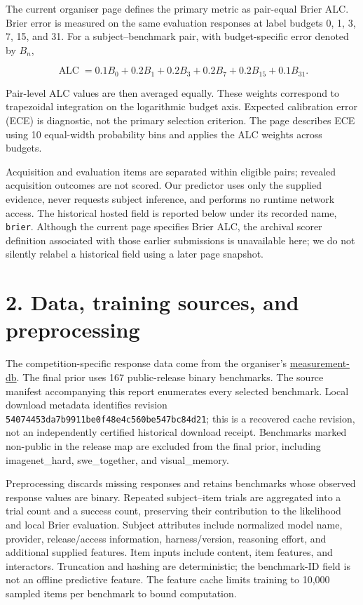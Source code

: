 \documentclass{article}
\providecommand{\passthrough}[1]{#1}
\begin{document}
The current organiser page defines the primary metric as pair-equal Brier ALC. Brier error is measured on the same evaluation responses at label budgets 0, 1, 3, 7, 15, and 31. For a subject--benchmark pair, with budget-specific error denoted by \(B_n\),

\[\operatorname{ALC}=0.1B_0+0.2B_1+0.2B_3+0.2B_7+0.2B_{15}+0.1B_{31}.\]

Pair-level ALC values are then averaged equally. These weights correspond to trapezoidal integration on the logarithmic budget axis. Expected calibration error (ECE) is diagnostic, not the primary selection criterion. The page describes ECE using 10 equal-width probability bins and applies the ALC weights across budgets.

Acquisition and evaluation items are separated within eligible pairs; revealed acquisition outcomes are not scored. Our predictor uses only the supplied evidence, never requests subject inference, and performs no runtime network access. The historical hosted field is reported below under its recorded name, \passthrough{\lstinline!brier!}. Although the current page specifies Brier ALC, the archival scorer definition associated with those earlier submissions is unavailable here; we do not silently relabel a historical field using a later page snapshot.

\section{2. Data, training sources, and preprocessing}\label{data-training-sources-and-preprocessing}

The competition-specific response data come from the organiser's \href{https://huggingface.co/datasets/aims-foundations/measurement-db}{measurement-db}. The final prior uses 167 public-release binary benchmarks. The source manifest accompanying this report enumerates every selected benchmark. Local download metadata identifies revision \passthrough{\lstinline!54074453da7b9911be0f48e4c560be547bc84d21!}; this is a recovered cache revision, not an independently certified historical download receipt. Benchmarks marked non-public in the release map are excluded from the final prior, including imagenet\_hard, swe\_together, and visual\_memory.

Preprocessing discards missing responses and retains benchmarks whose observed response values are binary. Repeated subject--item trials are aggregated into a trial count and a success count, preserving their contribution to the likelihood and local Brier evaluation. Subject attributes include normalized model name, provider, release/access information, harness/version, reasoning effort, and additional supplied features. Item inputs include content, item features, and interactors. Truncation and hashing are deterministic; the benchmark-ID field is not an offline predictive feature. The feature cache limits training to 10,000 sampled items per benchmark to bound computation.
\end{document}

